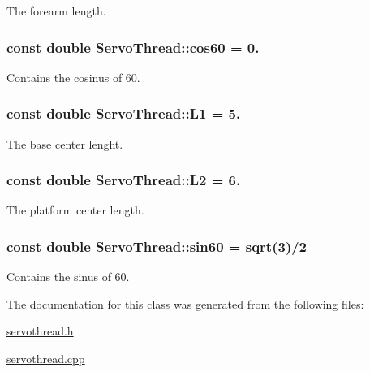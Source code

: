 The forearm length. 

\hypertarget{class_servo_thread_a86dc58ff23326f939cd6fb610ac90d53}{}
\subsubsection[{cos60}]{\setlength{\rightskip}{0pt plus 5cm}const double Servo\+Thread\+::cos60 = 0.\hspace{0.3cm}{\ttfamily [private]}}\label{class_servo_thread_a86dc58ff23326f939cd6fb610ac90d53}


Contains the cosinus of 60. 

\hypertarget{class_servo_thread_a6281142e50115dd8c914c14cfae6f90d}{}
\subsubsection[{L1}]{\setlength{\rightskip}{0pt plus 5cm}const double Servo\+Thread\+::\+L1 = 5.\hspace{0.3cm}{\ttfamily [private]}}\label{class_servo_thread_a6281142e50115dd8c914c14cfae6f90d}


The base center lenght. 

\hypertarget{class_servo_thread_a3d51c16b1f498b48a6ecbfaadaba6ed2}{}
\subsubsection[{L2}]{\setlength{\rightskip}{0pt plus 5cm}const double Servo\+Thread\+::\+L2 = 6.\hspace{0.3cm}{\ttfamily [private]}}\label{class_servo_thread_a3d51c16b1f498b48a6ecbfaadaba6ed2}


The platform center length. 

\hypertarget{class_servo_thread_aaa3e2dd194949b12f8a41ebd0d62fde9}{}
\subsubsection[{sin60}]{\setlength{\rightskip}{0pt plus 5cm}const double Servo\+Thread\+::sin60 = sqrt(3)/2\hspace{0.3cm}{\ttfamily [private]}}\label{class_servo_thread_aaa3e2dd194949b12f8a41ebd0d62fde9}


Contains the sinus of 60. 



The documentation for this class was generated from the following files\+:\begin{DoxyCompactItemize}
\item 
\hyperlink{servothread_8h}{servothread.\+h}\item 
\hyperlink{servothread_8cpp}{servothread.\+cpp}\end{DoxyCompactItemize}
